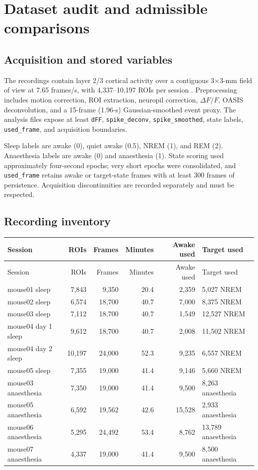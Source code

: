 \documentclass[11pt,a4paper]{article}
\begin{document}
\section{Dataset audit and admissible comparisons}

\subsection{Acquisition and stored variables}

The recordings contain layer 2/3 cortical activity over a contiguous 3$\times$3-mm field of view at 7.65 frames/s, with 4,337--10,197 ROIs per session \citep{kiyooka2026}. Preprocessing includes motion correction, ROI extraction, neuropil correction, $\Delta F/F$, OASIS deconvolution, and a 15-frame (1.96-s) Gaussian-smoothed event proxy. The analysis files expose at least \texttt{dFF}, \texttt{spike\_deconv}, \texttt{spike\_smoothed}, state labels, \texttt{used\_frame}, and acquisition boundaries.

Sleep labels are awake (0), quiet awake (0.5), NREM (1), and REM (2). Anaesthesia labels are awake (0) and anaesthesia (1). State scoring used approximately four-second epochs; very short epochs were consolidated, and \texttt{used\_frame} retains awake or target-state frames with at least 300 frames of persistence. Acquisition discontinuities are recorded separately and must be respected.

\subsection{Recording inventory}

\begin{longtable}{@{}P{0.25\textwidth}rrrrP{0.18\textwidth}@{}}
\toprule
Session & ROIs & Frames & Minutes & Awake used & Target used\\
\midrule
\endfirsthead
\toprule
Session & ROIs & Frames & Minutes & Awake used & Target used\\
\midrule
\endhead
mouse01 sleep & 7,843 & 9,350 & 20.4 & 2,359 & 5,027 NREM\\
mouse02 sleep & 6,574 & 18,700 & 40.7 & 7,000 & 8,375 NREM\\
mouse03 sleep & 7,112 & 18,700 & 40.7 & 1,549 & 12,527 NREM\\
mouse04 day 1 sleep & 9,612 & 18,700 & 40.7 & 2,008 & 11,502 NREM\\
mouse04 day 2 sleep & 10,197 & 24,000 & 52.3 & 9,235 & 6,557 NREM\\
mouse05 sleep & 7,355 & 19,000 & 41.4 & 9,146 & 5,660 NREM\\
mouse03 anaesthesia & 7,350 & 19,000 & 41.4 & 9,500 & 8,263 anaesthesia\\
mouse05 anaesthesia & 6,592 & 19,562 & 42.6 & 15,528 & 2,933 anaesthesia\\
mouse06 anaesthesia & 5,295 & 24,492 & 53.4 & 8,762 & 13,789 anaesthesia\\
mouse07 anaesthesia & 4,337 & 19,000 & 41.4 & 9,500 & 8,500 anaesthesia\\
\bottomrule
\end{longtable}
\end{document}
